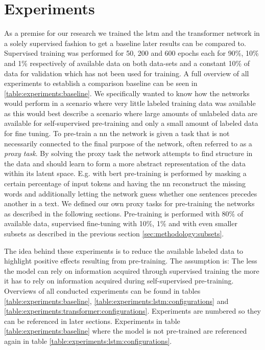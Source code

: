 \chapter{Experiments}\label{sec:experiments}


As a premise for our research we trained the \gls{lstm} and the transformer network in a solely supervised fashion to get a baseline later results can be compared to. Supervised training was performed for 50, 200 and 600 epochs each for 90\%, 10\% and 1\% respectively of available data on both data-sets and a constant 10\% of data for validation which has not been used for training. A full overview of all experiments to establish a comparison baseline can be seen in \ref{table:experiments:baseline}. We specifically wanted to know how the networks would perform in a scenario where very little labeled training data was available as this would best describe a scenario where large amounts of unlabeled data are available for self-supervised pre-training and only a small amount of labeled data for fine tuning. To pre-train a \gls{nn} the network is given a task that is not necessarily connected to the final purpose of the network, often referred to as a \textit{proxy task}. By solving the proxy task the network attempts to find structure in the data and should learn to form a more abstract representation of the data within its latent space. E.g. with \gls{bert} pre-training is performed by masking a certain percentage of input tokens and having the \gls{nn} reconstruct the missing words and additionally letting the network guess whether one sentences precedes another in a text. We defined our own proxy tasks for pre-training the networks as described in the following sections. Pre-training is performed with 80\% of available data, supervised fine-tuning with 10\%, 1\% and with even smaller subsets as described in the previous section \ref{sec:methodology:subsets}. \par
The idea behind these experiments is to reduce the available labeled data to highlight positive effects resulting from pre-training. The assumption is: The less the model can rely on information acquired through supervised training the more it has to rely on information acquired during self-supervised pre-training. Overviews of all conducted experiments can be found in tables \ref{table:experiments:baseline}, \ref{table:experiments:lstm:configurations} and \ref{table:experiments:transformer:configurations}.
Experiments are numbered so they can be referenced in later sections. Experiments in table \ref{table:experiments:baseline} where the model is not pre-trained are referenced again in table \ref{table:experiments:lstm:configurations}.

